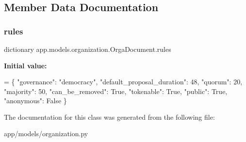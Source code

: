 \subsection{Member Data Documentation}
\mbox{\label{classapp_1_1models_1_1organization_1_1_orga_document_ad290f6e5812e7350ba94232ec449e70a}} 
\subsubsection{\texorpdfstring{rules}{rules}}
{\footnotesize\ttfamily dictionary app.\+models.\+organization.\+Orga\+Document.\+rules\hspace{0.3cm}{\ttfamily [static]}}

{\bfseries Initial value\+:}
\begin{DoxyCode}
=  \{
        \textcolor{stringliteral}{"governance"}: \textcolor{stringliteral}{"democracy"},
        \textcolor{stringliteral}{"default\_proposal\_duration"}: 48,
        \textcolor{stringliteral}{"quorum"}: 20,
        \textcolor{stringliteral}{"majority"}: 50,
        \textcolor{stringliteral}{"can\_be\_removed"}: \textcolor{keyword}{True},
        \textcolor{stringliteral}{"tokenable"}: \textcolor{keyword}{True},
        \textcolor{stringliteral}{"public"}: \textcolor{keyword}{True},
        \textcolor{stringliteral}{"anonymous"}: \textcolor{keyword}{False}
    \}
\end{DoxyCode}


The documentation for this class was generated from the following file\+:\begin{DoxyCompactItemize}
\item 
app/models/organization.\+py\end{DoxyCompactItemize}
